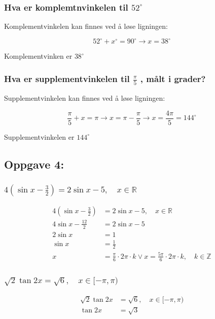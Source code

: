 \documentclass{article}
\begin{document}
\subsubsection{Hva er komplemtnvinkelen til $52^{\circ}$}

Komplementvinkelen kan finnes ved å løse ligningen:

$$52^{\circ}+x^{\circ}=90^{\circ} \rightarrow x=38^{\circ}$$

Komplementvinken er $38^{\circ}$

\subsubsection{Hva er supplementvinkelen til $\frac{\pi}{5}$ , målt i grader?}

Supplementvinkelen kan finnes ved å løse ligningen:

$$\frac{\pi}{5} + x = \pi \rightarrow x = \pi - \frac{\pi}{5} \rightarrow x = \frac{4\pi}{5} = 144^\circ$$

Supplementvinkelen er $144^\circ$

\subsection{Oppgave 4: }

\subsubsection{$4(\sin x-\frac{3}{2}) = 2 \sin x-5, \quad x \in \mathbb{R}$}

\begin{align*}
    4(\sin x-\frac{3}{2}) &= 2\sin x-5, \quad x \in \mathbb{R} \\
    4\sin x - \frac{12}{2} &= 2 \sin x-5 \\
    2\sin x &= 1 \\
    \sin x &= \frac{1}{2} \\
    x &= \frac{\pi}{6} \cdot 2\pi \cdot k \lor x = \frac{5 \pi}{6} \cdot 2 \pi \cdot k , \quad k \in \mathbb{Z}
\end{align*}

\subsubsection{$\sqrt{2} \tan 2x = \sqrt{6}, \quad x \in [-\pi, \pi)$}

\begin{align*}
    \sqrt{2} \tan 2x &= \sqrt{6}, \quad x \in [-\pi, \pi) \\
    \tan 2x &= \sqrt3
\end{align*}
\end{document}
